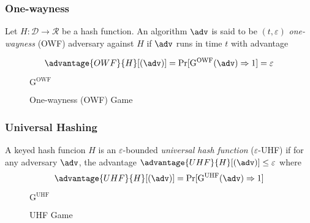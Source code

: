 \subsubsection{One-wayness}
Let $H: \mathcal{D} \rightarrow \mathcal{R}$ be a hash function. An algorithm $\adv$ is said to be $(t,\varepsilon)$ \textit{one-wayness} (OWF) adversary against $H$ if $\adv$ runs in time $t$ with advantage 

$$
\advantage{OWF}{H}[(\adv)] = \Pr[\mathrm{G}^\text{OWF}(\adv) \Rightarrow 1] = \varepsilon
$$ 

\begin{figure}[!h]
\centering
\begin{codeframe}[colback = white, width=5.5cm, height=5cm]{$\mathrm{G}^{\text{OWF}}$}
\begin{pchstack}[space=0.5cm]
\end{pchstack}
\end{codeframe}
\caption{One-wayness (OWF) Game}
\label{fig:owf-game}
\end{figure}


\subsubsection{Universal Hashing} A keyed hash funcion $H$ is an $\varepsilon$-bounded \textit{universal hash function} ($\varepsilon$-UHF) if for any adversary $\adv$, the advantage $\advantage{UHF}{H}[(\adv)] \leq \varepsilon$ where 
$$
\advantage{UHF}{H}[(\adv)] = \Pr[\mathrm{G}^\text{UHF}(\adv) \Rightarrow 1]
$$

\begin{figure}[!h]
\centering
\begin{codeframe}[colback = white, width=5.75cm, height=5cm]{$\mathrm{G}^{\text{UHF}}$}
\begin{pchstack}
\end{pchstack}
\end{codeframe}
\caption{UHF Game}
\label{fig:uhf-game}
\end{figure}


